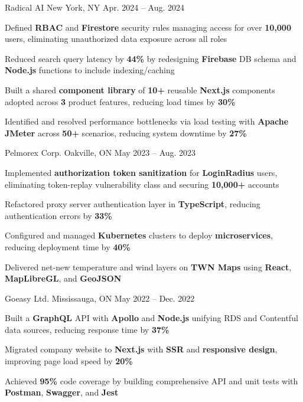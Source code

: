 \documentclass[11pt, a4paper]{awesome-cv}
\begin{document}
\begin{cventries}
  \cventry
    {\color{lightblue}{SOFTWARE ENGINEER INTERN}}
    {Radical AI}
    {New York, NY}
    {Apr. 2024 -- Aug. 2024}
    {
      \begin{cvitems}
        \item{Defined \textbf{RBAC} and \textbf{Firestore} security rules managing access for over \textbf{10,000} users, eliminating unauthorized data exposure across all roles}
        \item{Reduced search query latency by \textbf{44\%} by redesigning \textbf{Firebase} DB schema and \textbf{Node.js} functions to include indexing/caching}
        \item{Built a shared \textbf{component library} of \textbf{10+} reusable \textbf{Next.js} components adopted across \textbf{3} product features, reducing load times by \textbf{30\%}}
        \item{Identified and resolved performance bottlenecks via load testing with \textbf{Apache JMeter} across \textbf{50+} scenarios, reducing system downtime by \textbf{27\%}}
      \end{cvitems}
    }

  \vspace{3mm}

  \cventry
    {\color{lightblue}{SOFTWARE ENGINEER INTERN}}
    {Pelmorex Corp.}
    {Oakville, ON}
    {May 2023 -- Aug. 2023}
    {
      \begin{cvitems}
        \item{Implemented \textbf{authorization token sanitization} for \textbf{LoginRadius} users, eliminating token-replay vulnerability class and securing \textbf{10,000+} accounts}
        \item{Refactored proxy server authentication layer in \textbf{TypeScript}, reducing authentication errors by \textbf{33\%}}
        \item{Configured and managed \textbf{Kubernetes} clusters to deploy \textbf{microservices}, reducing deployment time by \textbf{40\%}}
        \item{Delivered net-new temperature and wind layers on \textbf{TWN Maps} using \textbf{React}, \textbf{MapLibreGL}, and \textbf{GeoJSON}}
      \end{cvitems}
    }

  \vspace{3mm}

  \cventry
    {\color{lightblue}{FRONT-END DEVELOPER INTERN}}
    {Goeasy Ltd.}
    {Mississauga, ON}
    {May 2022 -- Dec. 2022}
    {
      \begin{cvitems}
        \item{Built a \textbf{GraphQL} API with \textbf{Apollo} and \textbf{Node.js} unifying RDS and Contentful data sources, reducing response time by \textbf{37\%}}
        \item{Migrated company website to \textbf{Next.js} with \textbf{SSR} and \textbf{responsive design}, improving page load speed by \textbf{20\%}}
        \item{Achieved \textbf{95\%} code coverage by building comprehensive API and unit tests with \textbf{Postman}, \textbf{Swagger}, and \textbf{Jest}}
      \end{cvitems}
    }


\end{cventries}
\end{document}
